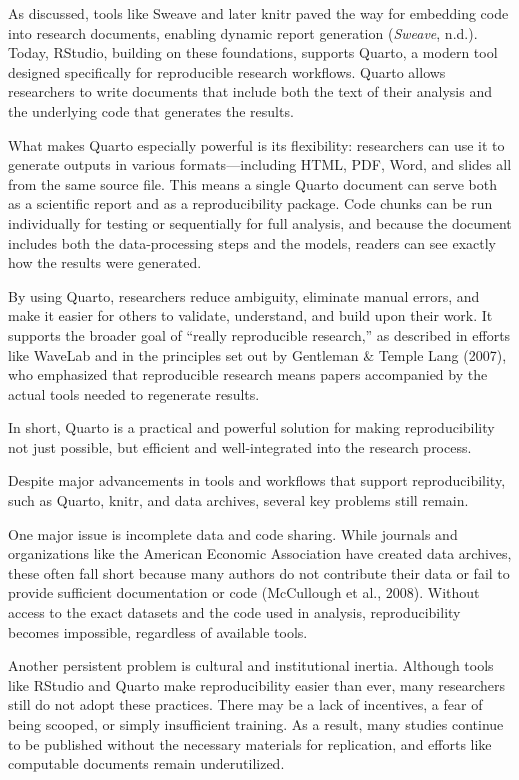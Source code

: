 \documentclass[
  a4paper,
]{article}
\begin{document}
As discussed, tools like Sweave and later knitr paved the way for
embedding code into research documents, enabling dynamic report
generation (\emph{Sweave}, n.d.). Today, RStudio, building on these
foundations, supports Quarto, a modern tool designed specifically for
reproducible research workflows. Quarto allows researchers to write
documents that include both the text of their analysis and the
underlying code that generates the results.

What makes Quarto especially powerful is its flexibility: researchers
can use it to generate outputs in various formats---including HTML, PDF,
Word, and slides all from the same source file. This means a single
Quarto document can serve both as a scientific report and as a
reproducibility package. Code chunks can be run individually for testing
or sequentially for full analysis, and because the document includes
both the data-processing steps and the models, readers can see exactly
how the results were generated.

By using Quarto, researchers reduce ambiguity, eliminate manual errors,
and make it easier for others to validate, understand, and build upon
their work. It supports the broader goal of ``really reproducible
research,'' as described in efforts like WaveLab and in the principles
set out by Gentleman \& Temple Lang (2007), who emphasized that
reproducible research means papers accompanied by the actual tools
needed to regenerate results.

In short, Quarto is a practical and powerful solution for making
reproducibility not just possible, but efficient and well-integrated
into the research process.

Despite major advancements in tools and workflows that support
reproducibility, such as Quarto, knitr, and data archives, several key
problems still remain.

One major issue is incomplete data and code sharing. While journals and
organizations like the American Economic Association have created data
archives, these often fall short because many authors do not contribute
their data or fail to provide sufficient documentation or code
(McCullough et al., 2008). Without access to the exact datasets and the
code used in analysis, reproducibility becomes impossible, regardless of
available tools.

Another persistent problem is cultural and institutional inertia.
Although tools like RStudio and Quarto make reproducibility easier than
ever, many researchers still do not adopt these practices. There may be
a lack of incentives, a fear of being scooped, or simply insufficient
training. As a result, many studies continue to be published without the
necessary materials for replication, and efforts like computable
documents remain underutilized.
\end{document}
